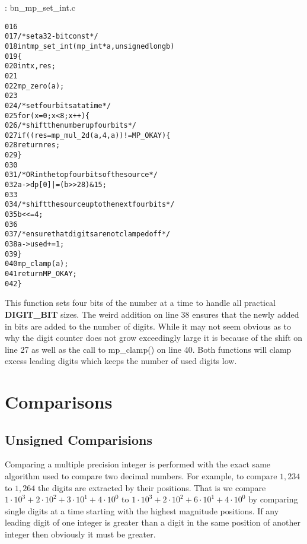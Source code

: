 \documentclass[b5paper]{book}
\begin{document}
\vspace{+3mm}\begin{small}
\hspace{-5.1mm}{\bf File}: bn\_mp\_set\_int.c
\vspace{-3mm}
\begin{alltt}
016   
017   /* set a 32-bit const */
018   int mp_set_int (mp_int * a, unsigned long b)
019   \{
020     int     x, res;
021   
022     mp_zero (a);
023     
024     /* set four bits at a time */
025     for (x = 0; x < 8; x++) \{
026       /* shift the number up four bits */
027       if ((res = mp_mul_2d (a, 4, a)) != MP_OKAY) \{
028         return res;
029       \}
030   
031       /* OR in the top four bits of the source */
032       a->dp[0] |= (b >> 28) & 15;
033   
034       /* shift the source up to the next four bits */
035       b <<= 4;
036   
037       /* ensure that digits are not clamped off */
038       a->used += 1;
039     \}
040     mp_clamp (a);
041     return MP_OKAY;
042   \}
\end{alltt}
\end{small}

This function sets four bits of the number at a time to handle all practical \textbf{DIGIT\_BIT} sizes.  The weird
addition on line 38 ensures that the newly added in bits are added to the number of digits.  While it may not 
seem obvious as to why the digit counter does not grow exceedingly large it is because of the shift on line 27 
as well as the  call to mp\_clamp() on line 40.  Both functions will clamp excess leading digits which keeps 
the number of used digits low.

\section{Comparisons}
\subsection{Unsigned Comparisions}
Comparing a multiple precision integer is performed with the exact same algorithm used to compare two decimal numbers.  For example,
to compare $1,234$ to $1,264$ the digits are extracted by their positions.  That is we compare $1 \cdot 10^3 + 2 \cdot 10^2 + 3 \cdot 10^1 + 4 \cdot 10^0$
to $1 \cdot 10^3 + 2 \cdot 10^2 + 6 \cdot 10^1 + 4 \cdot 10^0$ by comparing single digits at a time starting with the highest magnitude 
positions.  If any leading digit of one integer is greater than a digit in the same position of another integer then obviously it must be greater.  
\end{document}
